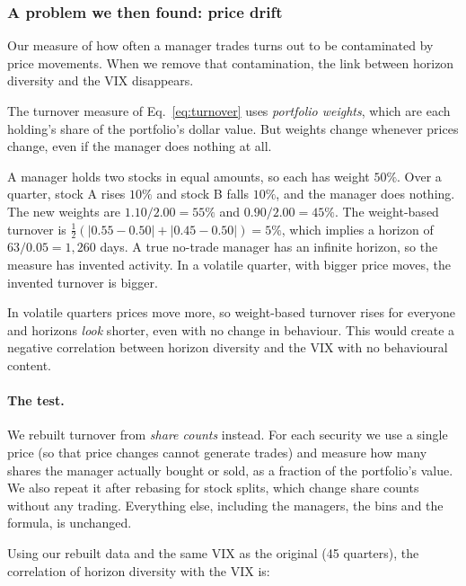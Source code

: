 \subsubsection{A problem we then found: price drift}

\begin{caution}
Our measure of how often a manager trades turns out to be contaminated by price movements. When we remove that contamination, the link between horizon diversity and the VIX disappears.
\end{caution}

The turnover measure of Eq.~\eqref{eq:turnover} uses \emph{portfolio weights}, which are each holding's share of the portfolio's dollar value. But weights change whenever prices change, even if the manager does nothing at all.

\begin{example}
A manager holds two stocks in equal amounts, so each has weight $50\%$. Over a quarter, stock A rises $10\%$ and stock B falls $10\%$, and the manager does nothing. The new weights are $1.10/2.00=55\%$ and $0.90/2.00=45\%$. The weight-based turnover is $\tfrac12(|0.55-0.50|+|0.45-0.50|)=5\%$, which implies a horizon of $63/0.05=1{,}260$ days. A true no-trade manager has an infinite horizon, so the measure has invented activity. In a volatile quarter, with bigger price moves, the invented turnover is bigger.
\end{example}

In volatile quarters prices move more, so weight-based turnover rises for everyone and horizons \emph{look} shorter, even with no change in behaviour. This would create a negative correlation between horizon diversity and the VIX with no behavioural content.

\paragraph{The test.} We rebuilt turnover from \emph{share counts} instead. For each security we use a single price (so that price changes cannot generate trades) and measure how many shares the manager actually bought or sold, as a fraction of the portfolio's value. We also repeat it after rebasing for stock splits, which change share counts without any trading. Everything else, including the managers, the bins and the formula, is unchanged.

Using our rebuilt data and the same VIX as the original (45 quarters), the correlation of horizon diversity with the VIX is:

